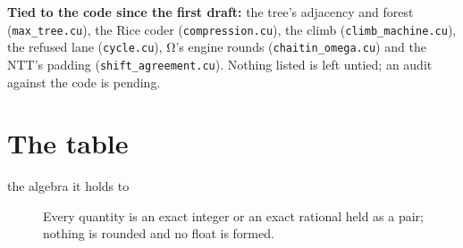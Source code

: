 \textbf{Tied to the code since the first draft:} the tree's adjacency and forest (\texttt{max\_\allowbreak{}tree.\allowbreak{}cu}), the Rice coder (\texttt{compression.\allowbreak{}cu}), the climb (\texttt{climb\_\allowbreak{}machine.\allowbreak{}cu}), the refused lane (\texttt{cycle.\allowbreak{}cu}), Ω's engine rounds (\texttt{chaitin\_\allowbreak{}omega.\allowbreak{}cu}) and the NTT's padding (\texttt{shift\_\allowbreak{}agreement.\allowbreak{}cu}). Nothing listed is left untied; an audit against the code is pending.

\section{\texorpdfstring{The table}{The table}}

\begin{description}
\item[{the algebra it holds to}] Every quantity is an exact integer or an exact rational held as a pair; nothing is rounded and no float is formed.

\end{description}
